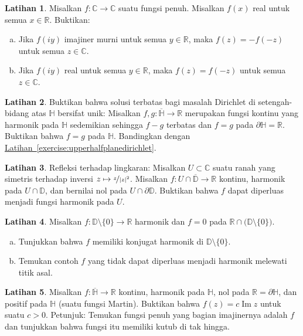 \documentclass[12pt,openany]{book}
\renewcommand{\Im}{\operatorname{Im}}
\newcommand{\abs}[1]{\left\lvert {#1} \right\rvert}
\newcommand{\C}{{\mathbb{C}}}
\newcommand{\R}{{\mathbb{R}}}
\newcommand{\D}{{\mathbb{D}}}
\newcommand{\bH}{{\mathbb{H}}}
\theoremstyle{plain}
\theoremstyle{remark}
\theoremstyle{definition}
\newenvironment{exbox}{%
    \def\FrameCommand{\vrule width 1pt \relax\hspace{10pt}}%
    \MakeFramed{\advance\hsize-\width\FrameRestore}%
}{%
    \endMakeFramed
}
\newenvironment{exparts}{%
    \leavevmode\begin{enumerate}[a),noitemsep,topsep=0pt,parsep=0pt,partopsep=0pt]
}{%
    \end{enumerate}
}
\theoremstyle{exercise}
\newtheorem{exercise}{Latihan}[section]
\theoremstyle{example}
\newcommand{\exerciseref}[1]{\hyperref[#1]{Latihan~\ref*{#1}}}
\begin{document}
\begin{exbox}
\begin{exercise}
Misalkan $f \colon \C \to \C$ suatu fungsi penuh.
Misalkan $f(x)$ real untuk semua $x \in \R$. Buktikan:
\begin{exparts}
\item
Jika $f(iy)$ imajiner murni untuk semua $y \in \R$,
maka $f(z)=-f(-z)$ untuk semua $z \in \C$.
\item
Jika $f(iy)$ real untuk semua $y \in \R$,
maka $f(z)=f(-z)$ untuk semua $z \in \C$.
\end{exparts}
\end{exercise}

\begin{exercise} \label{exercise:Hdirichuniq}
Buktikan bahwa solusi terbatas bagi masalah Dirichlet di
setengah-bidang atas $\bH$ bersifat unik:
Misalkan $f,g \colon \overline{\bH} \to \R$ merupakan 
fungsi kontinu yang harmonik pada $\bH$ sedemikian sehingga $f-g$ terbatas dan
$f=g$ pada $\partial \bH = \R$.  Buktikan bahwa $f=g$ pada $\bH$.
Bandingkan dengan \exerciseref{exercise:upperhalfplanedirichlet}.
\end{exercise}

\begin{exercise}
Refleksi terhadap lingkaran: Misalkan $U \subset
\C$ suatu ranah yang simetris terhadap inversi $z \mapsto
\nicefrac{z}{\abs{z}^2}$.
Misalkan $f \colon U \cap \overline{\D} \to \R$
kontinu, harmonik pada $U \cap \D$, dan
bernilai nol pada $U \cap \partial \D$.
Buktikan bahwa $f$ dapat diperluas menjadi fungsi harmonik pada $U$.
\end{exercise}

\begin{exercise}
Misalkan $f \colon \D \setminus \{ 0 \} \to \R$ harmonik dan $f = 0$
pada $\R \cap \bigl( \D \setminus \{ 0 \} \bigr)$.
\begin{exparts}
\item
Tunjukkan bahwa $f$ memiliki konjugat harmonik di $\D \setminus \{ 0 \}$.
\item
Temukan contoh $f$ yang tidak dapat diperluas menjadi harmonik melewati titik asal.
\end{exparts}
\end{exercise}

\begin{exercise}
Misalkan $f \colon \overline{\bH} \to \R$ kontinu, harmonik pada $\bH$, nol pada $\R = \partial \bH$,
dan positif pada $\bH$ (suatu fungsi Martin).
Buktikan bahwa $f(z) = c \Im z$ untuk suatu $c > 0$.
Petunjuk: Temukan fungsi penuh yang bagian imajinernya adalah $f$ dan
tunjukkan bahwa fungsi itu memiliki kutub di tak hingga.
\end{exercise}


\end{exbox}
\end{document}
